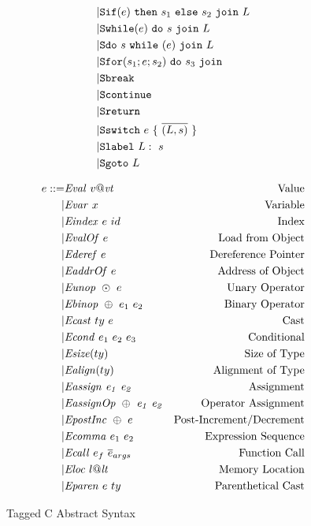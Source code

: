\documentclass[acmsmall,review,anonymous]{acmart}\settopmatter{printfolios=true,printccs=false,printacmref=false}
\begin{document}
\begin{figure}
\begin{subfigure}[t]{0.3\textwidth}
\[\begin{aligned}
    | & \mathtt{Sif}(e) ~ \mathtt{then} ~ s_1 ~ \mathtt{else} ~ s_2 ~ \mathtt{join} ~ L \\
    | & \mathtt{Swhile}(e) ~ \mathtt{do} ~ s ~ \mathtt{join} ~ L \\
    | & \mathtt{Sdo} ~ s ~ \mathtt{while} ~ (e) ~ \mathtt{join} ~ L \\
    | & \mathtt{Sfor}(s_1; e; s_2) ~ \mathtt{do} ~ s_3 ~ \mathtt{join} ~ \\
    | & \mathtt{Sbreak} \\
    | & \mathtt{Scontinue} \\
    | & \mathtt{Sreturn} \\
    | & \mathtt{Sswitch} ~ e ~ \{ ~ \overline{(L,s)} ~ \} \\
    | & \mathtt{Slabel} ~ L: ~ s \\
    | & \mathtt{Sgoto} ~ L \\    
    \end{aligned}\]
  \end{subfigure}
  \begin{subfigure}[t]{0.69\textwidth}
    \[\begin{aligned}
    e ::= & \mathit{Eval} ~ v@\mathit{vt} & \textnormal{Value} \\
    | & \mathit{Evar} ~ x & \textnormal{Variable} \\
    | & \mathit{Eindex} ~ e ~ id & \textnormal{Index} \\
    | & \mathit{EvalOf} ~ e & \textnormal{Load from Object} \\
    | & \mathit{Ederef} ~ e & \textnormal{Dereference Pointer} \\
    | & \mathit{EaddrOf} ~ e & \textnormal{Address of Object} \\
    | & \mathit{Eunop} ~ \odot ~ e & \textnormal{Unary Operator} \\
    | & \mathit{Ebinop} ~ \oplus ~ e_1 ~ e_2 & \textnormal{Binary Operator} \\
    | & \mathit{Ecast} ~ ty ~ e & \textnormal{Cast} \\
    | & \mathit{Econd} ~ e_1 ~ e_2 ~ e_3 & \textnormal{Conditional} \\
    | & \mathit{Esize}(ty) & \textnormal{Size of Type} \\
    | & \mathit{Ealign}(ty) & \textnormal{Alignment of Type} \\
    | & \mathit{Eassign ~ e_1 ~ e_2} & \textnormal{Assignment} \\
    | & \mathit{EassignOp ~ \oplus ~ e_1 ~ e_2} & \textnormal{Operator Assignment} \\
    | & \mathit{EpostInc} ~ \oplus ~ e & \textnormal{Post-Increment/Decrement} \\
    | & \mathit{Ecomma} ~ e_1 ~ e_2 & \textnormal{Expression Sequence} \\
    | & \mathit{Ecall} ~ e_f ~ \overline{e}_{args} & \textnormal{Function Call} \\
    | & \mathit{Eloc} ~ l@\mathit{lt} & \textnormal{Memory Location} \\
    | & \mathit{Eparen} ~ e ~ ty & \textnormal{Parenthetical Cast} \\
    \end{aligned}\]
  \end{subfigure}
  \caption{Tagged C Abstract Syntax}
  \label{fig:syntax}
\end{figure}
\end{document}
